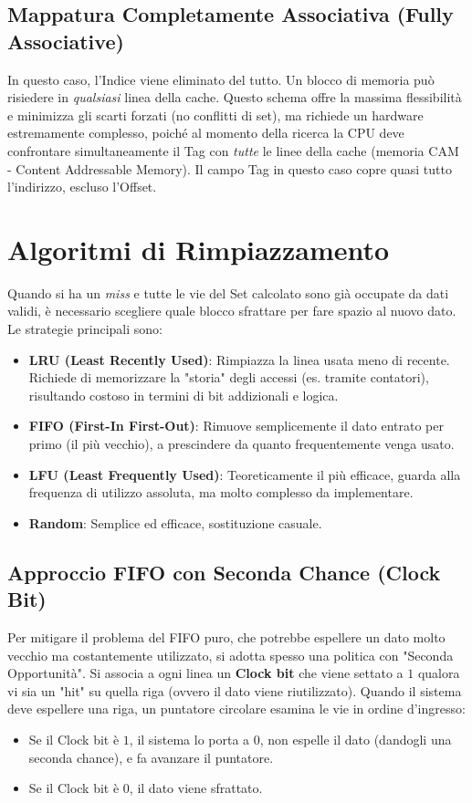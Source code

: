 \subsection{Mappatura Completamente Associativa (Fully Associative)}
In questo caso, l'Indice viene eliminato del tutto. Un blocco di memoria può risiedere in \textit{qualsiasi} linea della cache. 
Questo schema offre la massima flessibilità e minimizza gli scarti forzati (no conflitti di set), ma richiede un hardware estremamente complesso, poiché al momento della ricerca la CPU deve confrontare simultaneamente il Tag con \textit{tutte} le linee della cache (memoria CAM - Content Addressable Memory). Il campo Tag in questo caso copre quasi tutto l'indirizzo, escluso l'Offset.

\section{Algoritmi di Rimpiazzamento}
Quando si ha un \textit{miss} e tutte le vie del Set calcolato sono già occupate da dati validi, è necessario scegliere quale blocco sfrattare per fare spazio al nuovo dato. Le strategie principali sono:
\begin{itemize}
    \item \textbf{LRU (Least Recently Used)}: Rimpiazza la linea usata meno di recente. Richiede di memorizzare la "storia" degli accessi (es. tramite contatori), risultando costoso in termini di bit addizionali e logica.
    \item \textbf{FIFO (First-In First-Out)}: Rimuove semplicemente il dato entrato per primo (il più vecchio), a prescindere da quanto frequentemente venga usato. 
    \item \textbf{LFU (Least Frequently Used)}: Teoreticamente il più efficace, guarda alla frequenza di utilizzo assoluta, ma molto complesso da implementare.
    \item \textbf{Random}: Semplice ed efficace, sostituzione casuale.
\end{itemize}

\subsection{Approccio FIFO con Seconda Chance (Clock Bit)}
Per mitigare il problema del FIFO puro, che potrebbe espellere un dato molto vecchio ma costantemente utilizzato, si adotta spesso una politica con "Seconda Opportunità". Si associa a ogni linea un \textbf{Clock bit} che viene settato a $1$ qualora vi sia un "hit" su quella riga (ovvero il dato viene riutilizzato).
Quando il sistema deve espellere una riga, un puntatore circolare esamina le vie in ordine d'ingresso:
\begin{itemize}
    \item Se il Clock bit è $1$, il sistema lo porta a $0$, non espelle il dato (dandogli una seconda chance), e fa avanzare il puntatore.
    \item Se il Clock bit è $0$, il dato viene sfrattato.
\end{itemize}

